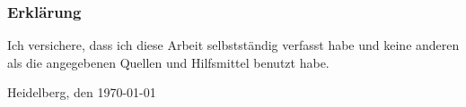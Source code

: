 
\subsubsection*{Erklärung}
\label{sub:Erklärung}

Ich versichere, dass ich diese Arbeit selbstständig verfasst habe und keine 
anderen als die angegebenen Quellen und Hilfsmittel benutzt habe.

\vspace{2\baselineskip}

Heidelberg, den \today \hspace{5em} \hrulefill

